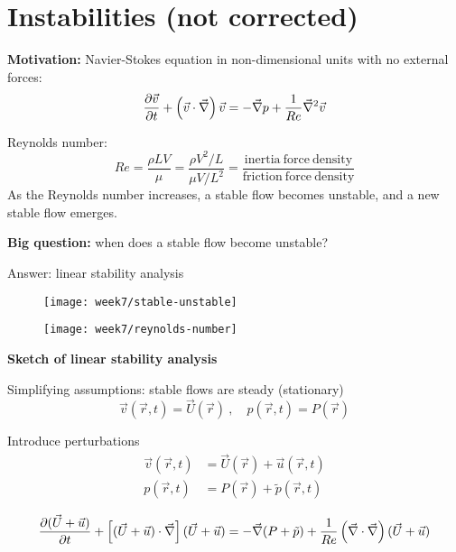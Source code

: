 \section{Instabilities (not corrected)}

\textbf{Motivation:} Navier-Stokes equation in non-dimensional units with no external forces:
\begin{equation}
\frac{\partial \vec{v}}{\partial t}+\left(\vec{v}\cdot\vec{\nabla}\right)\vec{v} = -\vec{\nabla}p+\frac{1}{Re}\vec{\nabla}^2\vec{v}
\end{equation}

Reynolds number:
\begin{equation}
Re = \frac{\rho LV}{\mu}=\frac{\rho V^2/L}{\mu V/L^2}=\frac{\mathrm{inertia\ force\ density}}{\mathrm{friction\ force\ density}}
\end{equation}
As the Reynolds number increases, a stable flow becomes unstable, and a new stable flow emerges.

\textbf{Big question:} when does a stable flow become unstable?

Answer: linear stability analysis

\begin{figure}[h]
    \centering
    \texttt{[image: week7/stable-unstable]}\\
    \caption{}
    \label{fig:stable-unstable}
\end{figure}


\begin{figure}[p]
    \centering
    \texttt{[image: week7/reynolds-number]}\\
    \caption{}
    \label{fig:reynolds-number}
\end{figure}


\textbf{Sketch of linear stability analysis}

Simplifying assumptions: stable flows are steady (stationary)
\begin{equation}
\vec{v}(\vec{r},t)=\vec{U}(\vec{r})\ ,\quad p(\vec{r},t)=P(\vec{r})
\end{equation}

Introduce perturbations
\begin{align}
\vec{v}(\vec{r},t)&=\vec{U}(\vec{r})+\vec{u}(\vec{r},t)\\
p(\vec{r},t)&=P(\vec{r})+\tilde{p}(\vec{r},t)
\end{align}

\begin{equation}
\frac{\partial (\vec{U}+\vec{u})}{\partial t}+\left[(\vec{U}+\vec{u})\cdot\vec{\nabla}\right](\vec{U}+\vec{u}) = -\vec{\nabla}(P+\tilde{p})+\frac{1}{Re}\left(\vec{\nabla}\cdot\vec\nabla\right)(\vec{U}+\vec{u})
\end{equation}

